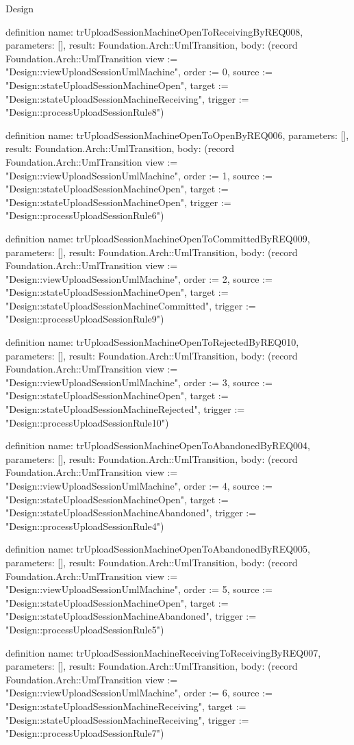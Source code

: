 \begin{lexlean}{Design}
\begin{semanticmodule}
definition{
  name: trUploadSessionMachineOpenToReceivingByREQ008,
  parameters: [],
  result: Foundation.Arch::UmlTransition,
  body: (record Foundation.Arch::UmlTransition {view := "Design::viewUploadSessionUmlMachine", order := 0, source := "Design::stateUploadSessionMachineOpen", target := "Design::stateUploadSessionMachineReceiving", trigger := "Design::processUploadSessionRule8"})
}

definition{
  name: trUploadSessionMachineOpenToOpenByREQ006,
  parameters: [],
  result: Foundation.Arch::UmlTransition,
  body: (record Foundation.Arch::UmlTransition {view := "Design::viewUploadSessionUmlMachine", order := 1, source := "Design::stateUploadSessionMachineOpen", target := "Design::stateUploadSessionMachineOpen", trigger := "Design::processUploadSessionRule6"})
}

definition{
  name: trUploadSessionMachineOpenToCommittedByREQ009,
  parameters: [],
  result: Foundation.Arch::UmlTransition,
  body: (record Foundation.Arch::UmlTransition {view := "Design::viewUploadSessionUmlMachine", order := 2, source := "Design::stateUploadSessionMachineOpen", target := "Design::stateUploadSessionMachineCommitted", trigger := "Design::processUploadSessionRule9"})
}

definition{
  name: trUploadSessionMachineOpenToRejectedByREQ010,
  parameters: [],
  result: Foundation.Arch::UmlTransition,
  body: (record Foundation.Arch::UmlTransition {view := "Design::viewUploadSessionUmlMachine", order := 3, source := "Design::stateUploadSessionMachineOpen", target := "Design::stateUploadSessionMachineRejected", trigger := "Design::processUploadSessionRule10"})
}

definition{
  name: trUploadSessionMachineOpenToAbandonedByREQ004,
  parameters: [],
  result: Foundation.Arch::UmlTransition,
  body: (record Foundation.Arch::UmlTransition {view := "Design::viewUploadSessionUmlMachine", order := 4, source := "Design::stateUploadSessionMachineOpen", target := "Design::stateUploadSessionMachineAbandoned", trigger := "Design::processUploadSessionRule4"})
}

definition{
  name: trUploadSessionMachineOpenToAbandonedByREQ005,
  parameters: [],
  result: Foundation.Arch::UmlTransition,
  body: (record Foundation.Arch::UmlTransition {view := "Design::viewUploadSessionUmlMachine", order := 5, source := "Design::stateUploadSessionMachineOpen", target := "Design::stateUploadSessionMachineAbandoned", trigger := "Design::processUploadSessionRule5"})
}

definition{
  name: trUploadSessionMachineReceivingToReceivingByREQ007,
  parameters: [],
  result: Foundation.Arch::UmlTransition,
  body: (record Foundation.Arch::UmlTransition {view := "Design::viewUploadSessionUmlMachine", order := 6, source := "Design::stateUploadSessionMachineReceiving", target := "Design::stateUploadSessionMachineReceiving", trigger := "Design::processUploadSessionRule7"})
}


\end{semanticmodule}
\end{lexlean}

